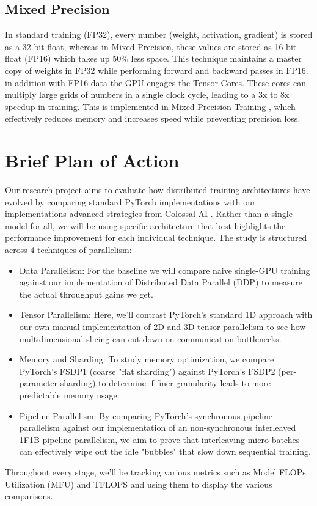 \documentclass[conference]{IEEEtran}
\begin{document}
\subsection{Mixed Precision} In standard training (FP32), every number (weight, activation, gradient) is stored as a 32-bit float, whereas in Mixed Precision, these values are stored as 16-bit float (FP16) which takes up 50\% less space. This technique maintains a master copy of weights in FP32 while performing forward and backward passes in FP16. in addition with FP16 data the GPU engages the Tensor Cores. These cores can multiply large grids of numbers in a single clock cycle, leading to a 3x to 8x speedup in training. This is implemented in Mixed Precision Training \cite{micikevicius2018mixed}, which effectively reduces memory and increases speed while preventing precision loss.

\section{Brief Plan of Action}

Our research project aims to evaluate how distributed training architectures have evolved by comparing standard PyTorch implementations with our implementations advanced strategies from Colossal AI \cite{10.1145/3605573.3605613}. Rather than a single model for all, we will be using specific architecture that best highlights the performance improvement for each individual technique.
The study is structured across 4 techniques of parallelism:
\begin{itemize}
    \item Data Parallelism: For the baseline we will compare naive single-GPU training against our implementation of Distributed Data Parallel (DDP) to measure the actual throughput gains we get.
    \item Tensor Parallelism: Here, we'll contrast PyTorch’s standard 1D approach with our own manual implementation of 2D and 3D tensor parallelism to see how multidimensional slicing can cut down on communication bottlenecks.
    \item Memory and Sharding: To study memory optimization, we compare PyTorch's FSDP1 (coarse "flat sharding") against PyTorch's FSDP2 (per-parameter sharding) to determine if finer granularity leads to more predictable memory usage.
    \item Pipeline Parallelism: By comparing PyTorch's synchronous pipeline parallelism against our implementation of an non-synchronous interleaved 1F1B pipeline parallelism, we aim to prove that interleaving micro-batches can effectively wipe out the idle "bubbles" that slow down sequential training.
\end{itemize}
Throughout every stage, we’ll be tracking various metrics such as Model FLOPs Utilization (MFU) and TFLOPS and using them to display the various comparisons.
\end{document}
